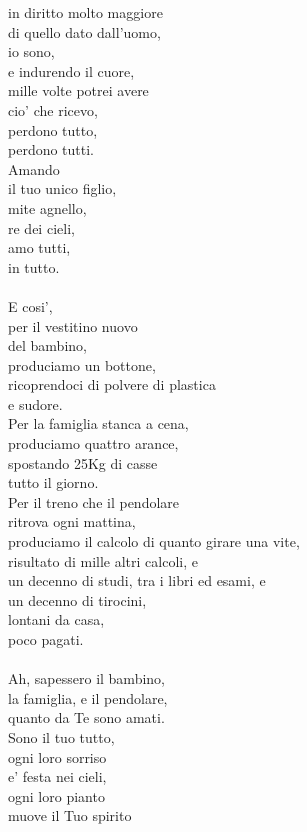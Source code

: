 \begin{haiku}
in diritto molto maggiore\\
di quello dato dall'uomo,\\
io sono,\\
e indurendo il cuore,\\
mille volte potrei avere\\
cio' che ricevo,\\
perdono tutto,\\
perdono tutti.\\
Amando \\
il tuo unico figlio,\\
mite agnello,\\
re dei cieli,\\
amo tutti,\\
in tutto.\\
\leavevmode\\
E cosi',\\
per il vestitino nuovo\\
del bambino,\\
produciamo un bottone,\\
ricoprendoci di polvere di plastica\\
e sudore.\\
Per la famiglia stanca a cena,\\
produciamo quattro arance,\\
spostando 25Kg di casse\\
tutto il giorno.\\
Per il treno che il pendolare \\
ritrova ogni mattina,\\
produciamo il calcolo di quanto girare una vite,\\
risultato di mille altri calcoli, e\\
un decenno di studi, tra i libri ed esami, e\\
un decenno di tirocini,\\
lontani da casa,\\
poco pagati.\\
\leavevmode\\
Ah, sapessero il bambino,\\
la famiglia, e il pendolare,\\
quanto da Te sono amati.\\
Sono il tuo tutto,\\
ogni loro sorriso\\
e' festa nei cieli,\\
ogni loro pianto\\
muove il Tuo spirito\\

\end{haiku}
